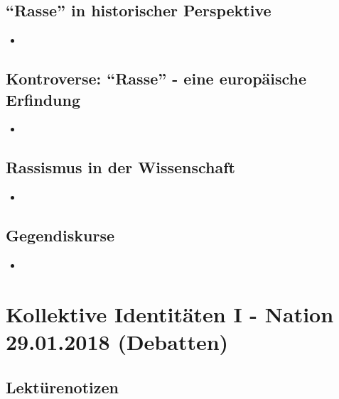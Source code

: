 \documentclass[emulatestandardclasses]{scrartcl}
\begin{document}
\subsection{"`Rasse"' in historischer Perspektive}

\begin{itemize}
  \item 
\end{itemize}

\subsection{Kontroverse: "`Rasse"' - eine europäische Erfindung}

\begin{itemize}
  \item 
\end{itemize}

\subsection{Rassismus in der Wissenschaft}

\begin{itemize}
  \item 
\end{itemize}


\subsection{Gegendiskurse}

\begin{itemize}
  \item 
\end{itemize}

\section{Kollektive Identitäten I - Nation\\29.01.2018 (Debatten)}

\subsection{Lektürenotizen}
\end{document}
